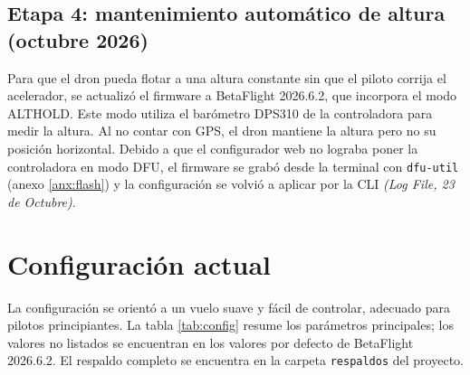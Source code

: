 \documentclass[11pt,letterpaper]{article}
\newcommand{\logref}[1]{\textit{(Log File, #1)}}
\begin{document}
\subsection{Etapa 4: mantenimiento automático de altura (octubre 2026)}
Para que el dron pueda flotar a una altura constante sin que el piloto corrija el acelerador, se actualizó el firmware a BetaFlight 2026.6.2, que incorpora el modo ALTHOLD. Este modo utiliza el barómetro DPS310 de la controladora para medir la altura. Al no contar con GPS, el dron mantiene la altura pero no su posición horizontal. Debido a que el configurador web no lograba poner la controladora en modo DFU, el firmware se grabó desde la terminal con \texttt{dfu-util} (anexo \ref{anx:flash}) y la configuración se volvió a aplicar por la CLI \logref{23 de Octubre}.

\section{Configuración actual}
La configuración se orientó a un vuelo suave y fácil de controlar, adecuado para pilotos principiantes. La tabla \ref{tab:config} resume los parámetros principales; los valores no listados se encuentran en los valores por defecto de BetaFlight 2026.6.2. El respaldo completo se encuentra en la carpeta \texttt{respaldos} del proyecto.
\end{document}
